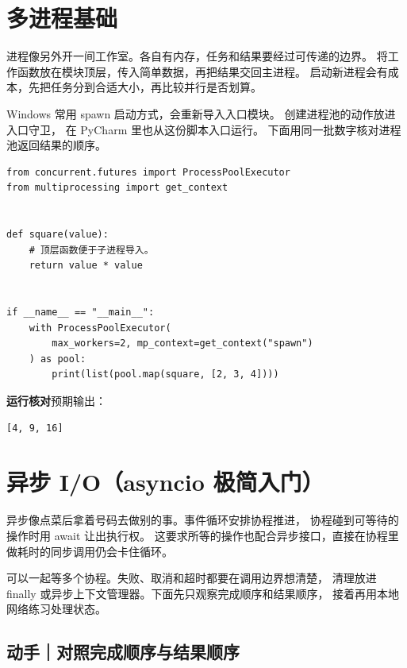 \documentclass[UTF8,a4paper,oneside,openany,fontset=none,11pt]{ctexbook}
\newcommand{\code}[1]{\texttt{\detokenize{#1}}}
\begin{document}
\par


\section{多进程基础}

进程像另外开一间工作室。各自有内存，任务和结果要经过可传递的边界。
将工作函数放在模块顶层，传入简单数据，再把结果交回主进程。
启动新进程会有成本，先把任务分到合适大小，再比较并行是否划算。

Windows 常用 spawn 启动方式，会重新导入入口模块。
创建进程池的动作放进入口守卫，
在 PyCharm 里也从这份脚本入口运行。
下面用同一批数字核对进程池返回结果的顺序。


\begin{lstlisting}[title={\code{process_squares.py}}]
from concurrent.futures import ProcessPoolExecutor
from multiprocessing import get_context


def square(value):
    # 顶层函数便于子进程导入。
    return value * value


if __name__ == "__main__":
    with ProcessPoolExecutor(
        max_workers=2, mp_context=get_context("spawn")
    ) as pool:
        print(list(pool.map(square, [2, 3, 4])))
\end{lstlisting}


\textbf{运行核对}\enspace 预期输出：
\begin{lstlisting}[language={},numbers=none]
[4, 9, 16]
\end{lstlisting}

\par


\section[异步 I/O]{异步 I/O（asyncio 极简入门）}

异步像点菜后拿着号码去做别的事。事件循环安排协程推进，
协程碰到可等待的操作时用 await 让出执行权。
这要求所等的操作也配合异步接口，直接在协程里做耗时的同步调用仍会卡住循环。

\code{gather()} 可以一起等多个协程。失败、取消和超时都要在调用边界想清楚，
清理放进 finally 或异步上下文管理器。下面先只观察完成顺序和结果顺序，
接着再用本地网络练习处理状态。

\subsection*{动手｜对照完成顺序与结果顺序}
\end{document}
